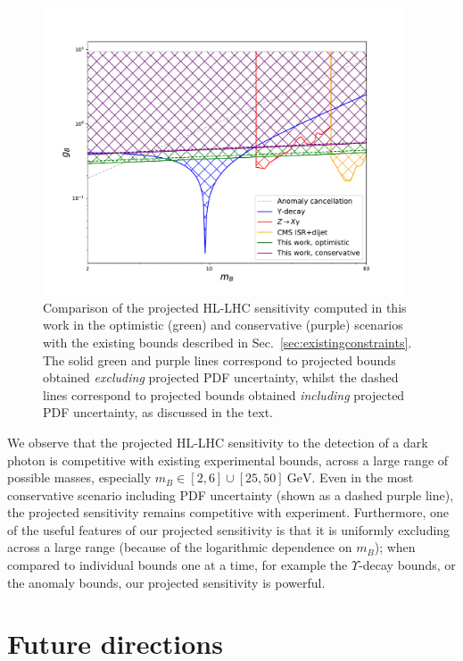 \documentclass[withindex,glossary]{cam-thesis}
\begin{document}
\begin{figure}
\centering
\includegraphics[width=0.95\textwidth]{darkphoton_figures/bounds_plot.pdf}
\caption{Comparison of the projected HL-LHC sensitivity computed in
  this work in the optimistic (green) and conservative (purple) scenarios with the
  existing bounds described in Sec.~\ref{sec:existingconstraints}. The solid green and
  purple lines correspond to projected bounds obtained \textit{excluding} projected PDF uncertainty, whilst the 
  dashed lines correspond to projected bounds obtained \textit{including} projected PDF uncertainty, as discussed in
  the text.}
\label{fig:limits}
\end{figure}

We observe that the projected HL-LHC sensitivity to the detection of a dark photon is competitive with existing experimental bounds, across a large range of possible masses, especially $m_B \in [2,6] \cup [25, 50]\ \text{GeV}$. Even in the most conservative scenario including PDF uncertainty (shown as a dashed purple line), the projected sensitivity remains competitive with experiment. Furthermore, one of the useful features of our projected sensitivity is that it is uniformly excluding across a large range (because of the logarithmic dependence on $m_B$); when compared to individual bounds one at a time, for example the $\Upsilon$-decay bounds, or the anomaly bounds, our projected sensitivity is powerful.



\newpage
\section{Future directions}
\label{sec:dark_future}
\end{document}
